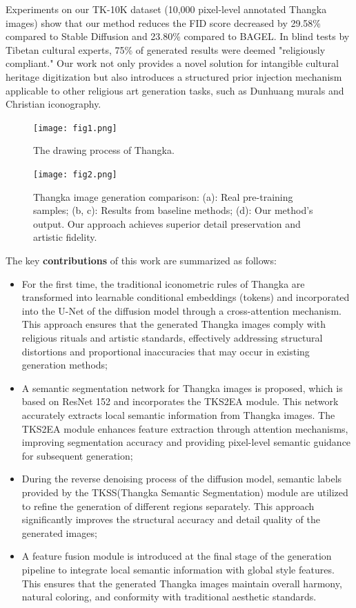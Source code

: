 \documentclass[sn-mathphys]{sn-jnl}%
\theoremstyle{thmstyleone}%
\theoremstyle{thmstyletwo}%
\theoremstyle{thmstylethree}%
\begin{document}
Experiments on our TK-10K dataset (10,000 pixel-level annotated Thangka images) show that our method reduces the FID score decreased by 29.58\% compared to Stable Diffusion and 23.80\% compared to BAGEL. In blind tests by Tibetan cultural experts, 75\% of generated results were deemed "religiously compliant." Our work not only provides a novel solution for intangible cultural heritage digitization but also introduces a structured prior injection mechanism applicable to other religious art generation tasks, such as Dunhuang murals and Christian iconography.

\begin{figure}[htbp]
	\centerline{\texttt{[image: fig1.png]}}
	\caption{The drawing process of Thangka.}
	\label{fig1}
\end{figure}
\begin{figure}[htbp]
	\centerline{\texttt{[image: fig2.png]}}
	\caption{Thangka image generation comparison: (a): Real pre-training samples; (b, c): Results from baseline methods; (d): Our method’s output. Our approach achieves superior detail preservation and artistic fidelity.}
	\label{fig2}
\end{figure}
The key \textbf{contributions} of this work are summarized as follows:
\begin{itemize}
	\item For the first time, the traditional iconometric rules of Thangka are transformed into learnable conditional embeddings (tokens) and incorporated into the U-Net of the diffusion model through a cross-attention mechanism. This approach ensures that the generated Thangka images comply with religious rituals and artistic standards, effectively addressing structural distortions and proportional inaccuracies that may occur in existing generation methods;
	\item A semantic segmentation network for Thangka images is proposed, which is based on ResNet 152 and incorporates the TKS2EA module. This network accurately extracts local semantic information from Thangka images. The TKS2EA module enhances feature extraction through attention mechanisms, improving segmentation accuracy and providing pixel-level semantic guidance for subsequent generation;
	\item During the reverse denoising process of the diffusion model, semantic labels provided by the TKSS(Thangka Semantic Segmentation) module are utilized to refine the generation of different regions separately. This approach significantly improves the structural accuracy and detail quality of the generated images;
	\item A feature fusion module is introduced at the final stage of the generation pipeline to integrate local semantic information with global style features. This ensures that the generated Thangka images maintain overall harmony, natural coloring, and conformity with traditional aesthetic standards.
\end{itemize}	
\end{document}
